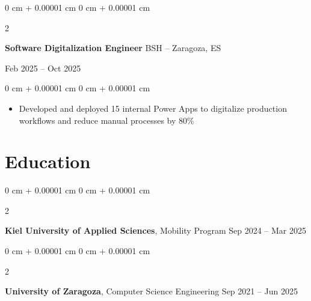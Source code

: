 \documentclass[10pt,a4paper,sans]{article}
\newenvironment{highlights}{
    \begin{itemize}[
        topsep=0.10 cm,
        parsep=0.10 cm,
        partopsep=0pt,
        itemsep=0pt,
        leftmargin=0 cm + 18pt
    ]
}{
    \end{itemize}
} %
\newenvironment{onecolentry}{
    \begin{adjustwidth}{
        0 cm + 0.00001 cm
    }{
        0 cm + 0.00001 cm
    }
}{
    \end{adjustwidth}
} %
\newenvironment{twocolentry}[2][]{
    \onecolentry
    \def\secondColumn{#2}
    \setcolumnwidth{\fill, 4.5 cm}
    \begin{paracol}{2}
}{
    \switchcolumn \raggedleft \secondColumn
    \end{paracol}
    \endonecolentry
} %
\begin{document}
    \vspace{0.2 cm}

    \begin{twocolentry}{
        Feb 2025 – Oct 2025
    }
        \textbf{Software Digitalization Engineer} BSH -- Zaragoza, ES
    \end{twocolentry}

    \vspace{0.10 cm}
    \begin{onecolentry}
        \begin{highlights}
            \item Developed and deployed 15 internal Power Apps to digitalize production workflows and reduce manual processes by 80\%
        \end{highlights}
    \end{onecolentry}




    \section{Education}
        
        \begin{twocolentry}{
            Sep 2024 – Mar 2025
        }
            \textbf{Kiel University of Applied Sciences}, Mobility Program\end{twocolentry}


        \vspace{0.2 cm}

        \begin{twocolentry}{
            Sep 2021 – Jun 2025
        }
            \textbf{University of Zaragoza}, Computer Science Engineering\end{twocolentry}
\end{document}
